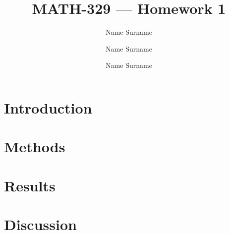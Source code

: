 \documentclass[11pt]{article}
\title{MATH-329 --- Homework 1}
\author{%
Name Surname \and Name Surname \and Name Surname}
\date{}
\begin{document}
\maketitle

\section{Introduction}

\section{Methods}

\section{Results}

\section{Discussion}
\end{document}
